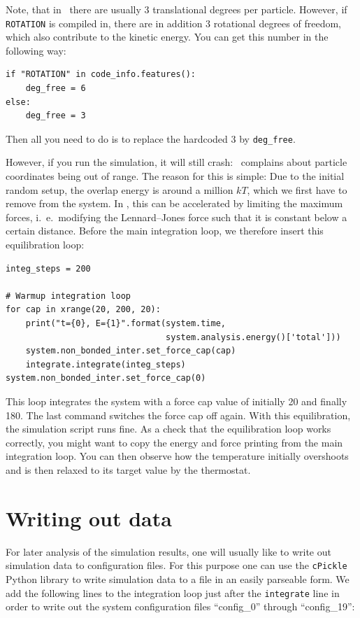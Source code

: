 \documentclass[
a4paper,                        %
11pt,                           %
twoside,                        %
footsepline,                    %
headsepline,                    %
headexclude,                    %
footexclude,                    %
pagesize,                       %
]{scrartcl}
\begin{document}
Note, that in \es\ there are usually 3 translational degrees per
particle. However, if \verb|ROTATION| is compiled in, there are in
addition 3 rotational degrees of freedom, which also contribute to the
kinetic energy.  You can get this number in the following way:

\begin{lstlisting}
if "ROTATION" in code_info.features():
    deg_free = 6
else:
    deg_free = 3
\end{lstlisting}

Then all you need to do is to replace the hardcoded 3 by \verb|deg_free|.

However, if you run the simulation, it will still
crash: \es\ complains about particle coordinates being out of range.
The reason for this is simple: Due to the initial random setup, the
overlap energy is around a million $kT$, which we first have to remove
from the system. In \es, this can be accelerated by limiting the maximum
forces, i.~e.\ modifying the Lennard--Jones force such that it is
constant below a certain distance. Before the main integration loop, we
therefore insert this equilibration loop:

\begin{lstlisting}
integ_steps = 200

# Warmup integration loop
for cap in xrange(20, 200, 20):
    print("t={0}, E={1}".format(system.time,
                                system.analysis.energy()['total']))
    system.non_bonded_inter.set_force_cap(cap)
    integrate.integrate(integ_steps)
system.non_bonded_inter.set_force_cap(0)
\end{lstlisting}

This loop integrates the system with a force cap value of initially 20 and
finally 180.  The last command switches the force cap off again. With
this equilibration, the simulation script runs fine. As a check
that the equilibration loop works correctly, you might want to copy the
energy and force printing from the main integration loop. You can then
observe how the temperature initially overshoots and is then relaxed to
its target value by the thermostat.

\section{Writing out data}

For later analysis of the simulation results, one will
usually like to write out simulation data to configuration files.
For this purpose one can use the \verb|cPickle| Python library to 
write simulation data to a file in an easily parseable form.  We add the 
following lines to the integration loop just after the \verb|integrate| line
in order to write out the system configuration files
``config\_0'' through ``config\_19'':
\end{document}
